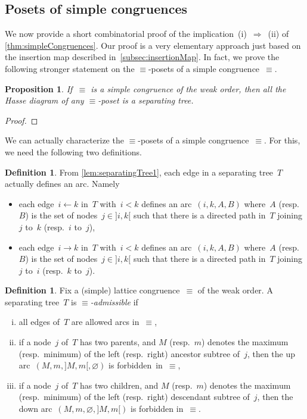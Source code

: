 \documentclass{amsart}
\newtheorem{proposition}[theorem]{Proposition}
\theoremstyle{definition}
\newtheorem{definition}[theorem]{Definition}
\newcommand{\darkblue}{\color{darkblue}} %
\newcommand{\defn}[1]{\textsl{\darkblue #1}} %
\newcommand{\vincent}[1]{\todo[color=blue!30]{#1 \\ \hfill --- V.}}
\begin{document}

\subsection{Posets of simple congruences}
\label{subsec:posetsSimpleCongruences}

We now provide a short combinatorial proof of the implication~(i)~$\Longrightarrow$~(ii) of \cref{thm:simpleCongruences}.
Our proof is a very elementary approach just based on the insertion map described in~\cref{subsec:insertionMap}.
In fact, we prove the following stronger statement on the $\equiv$-posets of a simple congruence~$\equiv$.

\begin{proposition}
\label{prop:simpleImpliesSeparatingTrees}
If~$\equiv$ is a simple congruence of the weak order, then all the Hasse diagram of any $\equiv$-poset is a separating tree.
\end{proposition}

\begin{proof}
\vincent{todo}
\end{proof}

We can actually characterize the $\equiv$-posets of a simple congruence~$\equiv$.
For this, we need the following two definitions.

\begin{definition}
\label{lem:edgeIsArc}
From \cref{lem:separatingTree1}, each edge in a separating tree~$T$ actually defines an arc. Namely
\begin{itemize}
\item each edge~$i \leftarrow k$ in~$T$ with~$i < k$ defines an arc~$(i, k, A, B)$ where~$A$ (resp.~$B$) is the set of nodes~$j \in {]i,k[}$ such that there is a directed path in~$T$ joining $j$ to~$k$ (resp.~$i$ to~$j$),
\item each edge~$i \to k$ in~$T$ with~$i < k$ defines an arc~$(i, k, A, B)$ where~$A$ (resp.~$B$) is the set of nodes~$j \in {]i,k[}$ such that there is a directed path in~$T$ joining $j$ to~$i$ (resp.~$k$ to~$j$).
\end{itemize}
\end{definition}

\begin{definition}
\label{def:admissibleSeparatingTrees}
Fix a (simple) lattice congruence~$\equiv$ of the weak order.
A separating tree~$T$ is \defn{$\equiv$-admissible} if
\begin{enumerate}[(i)]
\item all edges of~$T$ are allowed arcs in~$\equiv$,
\item if a node~$j$ of~$T$ has two parents, and $M$ (resp.~$m$) denotes the maximum (resp.~minimum) of the left (resp.~right) ancestor subtree of~$j$, then the up arc~$(M, m, {]M,m[}, \varnothing)$ is forbidden~in~$\equiv$,
\item if a node~$j$ of~$T$ has two children, and $M$ (resp.~$m$) denotes the maximum (resp.~minimum) of the left (resp.~right) descendant subtree of~$j$, then the down arc~$(M, m, \varnothing, {]M,m[})$ is forbidden in~$\equiv$.
\end{enumerate}
\end{definition}
\end{document}
